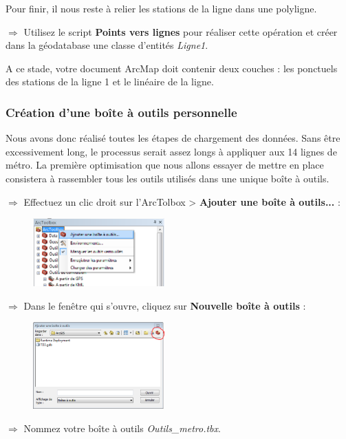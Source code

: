 \documentclass[11pt]{article}
\newcommand{\action}{$\Rightarrow$ }
\begin{document}
Pour finir, il nous reste à relier les stations de la ligne dans une polyligne.

\action Utilisez le script \textbf{Points vers lignes} pour réaliser cette opération et créer dans la géodatabase une classe d'entités \textit{Ligne1}.

A ce stade, votre document ArcMap doit contenir deux couches : les ponctuels des stations de la ligne 1 et le linéaire de la ligne.


\subsubsection{Création d'une boîte à outils personnelle}
Nous avons donc réalisé toutes les étapes de chargement des données. Sans être excessivement long, le processus serait assez longs à appliquer aux 14 lignes de métro. La première optimisation que nous allons essayer de mettre en place consistera à rassembler tous les outils utilisés dans une unique boîte à outils.

\action Effectuez un clic droit sur l'ArcTolbox > \textbf{Ajouter une boîte à outils...} :
\begin{figure}[H]
	\center \includegraphics[width=0.45\textwidth]{img/td3/arctoolbox_ajouter.png}\\
\end{figure}

\action Dans le fenêtre qui s'ouvre, cliquez sur \textbf{Nouvelle boîte à outils} :
\begin{figure}[H]
	\center \includegraphics[width=0.45\textwidth]{img/td3/arctoolbox_ajouter-2.png}\\
\end{figure}

\action Nommez votre boîte à outils \textit{Outils\_metro.tbx}.
\end{document}
